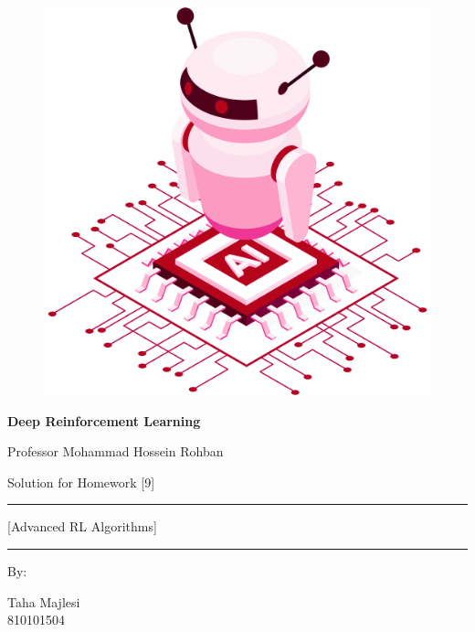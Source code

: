 \documentclass[12pt]{article}
\begin{document}
\thispagestyle{plain}

\begin{center}

\vspace*{-1.5cm}
\begin{figure}[!h]
    \centering
    \includegraphics[width=0.7\linewidth]{figs/cover-std.png}
\end{figure}

{

{\color{DarkBlue} {\fontsize{30}{50} \textbf{
Deep Reinforcement Learning
}}}

{\color{DarkBlue} {\Large
Professor Mohammad Hossein Rohban
}}
}


\vspace{20pt}

{


{\color{RedOrange}
{\Large
Solution for Homework [9]
}\\
}
{\color{BrickRed}
\rule{12cm}{0.5pt}

{\Huge
[Advanced RL Algorithms]
}
\rule{12cm}{0.5pt}
}

\vspace{10pt}

{\color{RoyalPurple} { \small By:} } \\
\vspace{10pt}

{\color{Blue} { \LARGE Taha Majlesi } } \\
\vspace{5pt}
{\color{RoyalBlue} { \Large 810101504 } }


}
\end{center}
\end{document}
